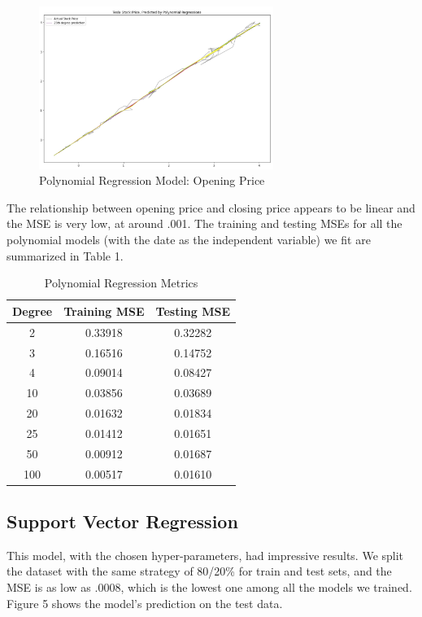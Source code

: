 \documentclass[12pt,a4paper]{article}
\begin{document}
\begin{figure}[h]
\caption{Polynomial Regression Model: Opening Price}
\centering
\includegraphics[width=3in]{./Figures/PolyRegression4.png}
\end{figure}

The relationship between opening price and closing price appears to be linear and the MSE is very low, at around .001. The training and testing MSEs for all the polynomial models (with the date as the independent variable) we fit are summarized in Table 1.

\begin{table}[h]
\caption{Polynomial Regression Metrics}
\centering
\begin{tabular}{ccc}
\hline
\hline
Degree & Training MSE & Testing MSE \\ \hline
2      & 0.33918      & 0.32282     \\
3      & 0.16516      & 0.14752     \\
4      & 0.09014      & 0.08427     \\
10     & 0.03856      & 0.03689     \\
20     & 0.01632      & 0.01834     \\
25     & 0.01412      & 0.01651     \\
50     & 0.00912      & 0.01687     \\
100    & 0.00517      & 0.01610     \\ \hline
\hline
\end{tabular}
\end{table}

\subsection{Support Vector Regression}
This model, with the chosen hyper-parameters, had impressive results. We split the dataset with the same strategy of 80/20\% for train and test sets, and the MSE is as low as .0008, which is the lowest one among all the models we trained. Figure 5 shows the model’s prediction on the test data. 
\end{document}
